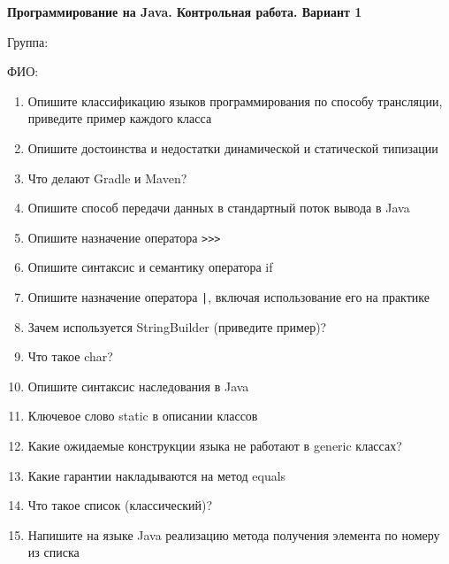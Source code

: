 \documentclass[12pt]{article}
\begin{document}
\begin{minipage}{\textwidth}
\textbf{Программирование на Java. Контрольная работа. Вариант 1}

Группа: \underline{\hspace{3cm}}

ФИО: \underline{\hspace{10cm}}

\begin{enumerate}
\item Опишите классификацию языков программирования по способу трансляции, приведите пример каждого класса
\item Опишите достоинства и недостатки динамической и статической типизации
\item Что делают Gradle и Maven?
\item Опишите способ передачи данных в стандартный поток вывода в Java
\item Опишите назначение оператора \verb|>>>|
\item Опишите синтаксис и семантику оператора if
\item Опишите назначение оператора \verb!|!, включая использование его на практике
\item Зачем используется StringBuilder (приведите пример)?
\item Что такое char?
\item Опишите синтаксис наследования в Java
\item Ключевое слово static в описании классов
\item Какие ожидаемые конструкции языка не работают в generic классах?
\item Какие гарантии накладываются на метод equals
\item Что такое список (классический)?
\item Напишите на языке Java реализацию метода получения элемента по номеру из списка

\end{enumerate}
\end{minipage}
\end{document}
